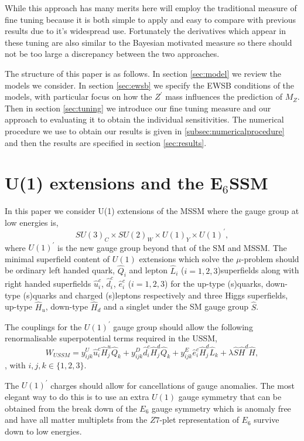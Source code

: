 \documentclass[preprint,amsmath,amssymb,aps,superscriptaddress,prd,showpacs,floatfix]{revtex4-1}
\newcommand{\be}{\begin{equation}}
\newcommand{\ee}{\end{equation}}
\begin{document}
While this approach has many merits here will employ the traditional
measure of fine tuning because it is both simple to apply and easy to
compare with previous results due to it's widespread use.  Fortunately
the derivatives which appear in these tuning are also similar to the
Bayesian motivated measure so there should not be too large a discrepancy between the two approaches.


The structure of this paper is as follows.  In section \ref{sec:model} we review the models we consider.  In section \ref{sec:ewsb} we specify the EWSB conditions of the models, with particular focus on how the $Z^\prime$ mass influences the prediction of $M_Z$.  Then in section \ref{sec:tuning} we introduce our fine tuning measure and our approach to evaluating it to obtain the individual sensitivities.  The numerical procedure we use to obtain our results is given in \ref{subsec:numericalprocedure} and then the results are specified in section \ref{sec:results}. 





 

\section{\label{sec:model}U(1) extensions and the E$_6$SSM}
In this paper we consider U(1) extensions of the MSSM where the gauge group at low energies is,
 \be
SU(3)_C\times SU(2)_W\times U(1)_Y\times U(1)^\prime, \ee 
where $U(1)^\prime$ is the new gauge group beyond that of the SM and MSSM. The minimal superfield content of $U(1)$ extensions which solve the $\mu$-problem should be ordinary left handed quark, $\hat{Q}_i$ and lepton $\hat{L}_i$ ($i=1,2,3$)superfields along with right handed superfields $\hat{u}^c_i$, $\hat{d}^c_i$,  $\hat{e}^c_i$ ($i=1,2,3$) for the up-type (s)quarks, down-type (s)quarks and charged (s)leptons respectively and three Higgs superfields, up-type $\hat{H}_u$, down-type $\hat{H}_d$ and a singlet under the SM gauge group $\hat{S}$.

  The couplings for the $U(1)^\prime$ gauge group should allow the following renormalisable superpotential terms required in the USSM,
\be
W_{USSM} =  y^U_{ijk} \hat{u}^c_i \hat{H}^u_{j} \hat{Q}_k + y^D_{ijk} \hat{d}^c_i \hat{H}^d_{j} \hat{Q}_k + y^E_{ijk} \hat{e}^c_i \hat{H}^d_{j} \hat{L}_k + \lambda \hat{S} \hat{H}^d \hat{H},
\ee, with $i,j,k \in \{1,2,3\}$.  


The $U(1)^\prime$ charges should allow for cancellations of gauge
anomalies. The most elegant way to do this is to use an extra $U(1)$
gauge symmetry that can be obtained from the break down of the $E_6$
gauge symmetry which is anomaly free and have all matter multiplets
from the $Z7$-plet representation of $E_6$ survive down to low energies.
\end{document}

